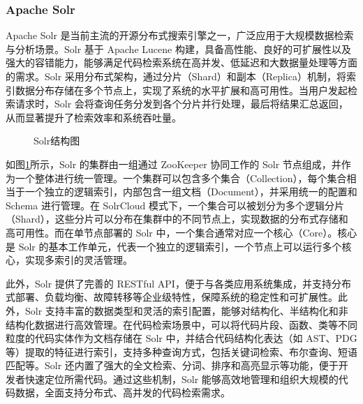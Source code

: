 \documentclass[UTF8,a4paper,12pt]{ctexart}
\numberwithin{equation}{section}
\begin{document}
\subsubsection{Apache Solr}
Apache Solr\cite{ref12} 是当前主流的开源分布式搜索引擎之一，广泛应用于大规模数据检索与分析场景。Solr 基于 Apache Lucene 构建，具备高性能、良好的可扩展性以及强大的容错能力，能够满足代码检索系统在高并发、低延迟和大数据量处理等方面的需求。Solr 采用分布式架构，通过分片（Shard）和副本（Replica）机制，将索引数据分布存储在多个节点上，实现了系统的水平扩展和高可用性。当用户发起检索请求时，Solr 会将查询任务分发到各个分片并行处理，最后将结果汇总返回，从而显著提升了检索效率和系统吞吐量。\par

\begin{figure}[H]
	\caption{Solr结构图}
	\label{solr}
\end{figure}

如图\ref{solr}所示，Solr 的集群由一组通过 ZooKeeper 协同工作的 Solr 节点组成，并作为一个整体进行统一管理。一个集群可以包含多个集合（Collection），每个集合相当于一个独立的逻辑索引，内部包含一组文档（Document），并采用统一的配置和 Schema 进行管理。在 SolrCloud 模式下，一个集合可以被划分为多个逻辑分片（Shard），这些分片可以分布在集群中的不同节点上，实现数据的分布式存储和高可用性。而在单节点部署的 Solr 中，一个集合通常对应一个核心（Core）。核心是 Solr 的基本工作单元，代表一个独立的逻辑索引，一个节点上可以运行多个核心，实现多索引的灵活管理。\par

此外，Solr 提供了完善的 RESTful API，便于与各类应用系统集成，并支持分布式部署、负载均衡、故障转移等企业级特性，保障系统的稳定性和可扩展性。此外，Solr 支持丰富的数据类型和灵活的索引配置，能够对结构化、半结构化和非结构化数据进行高效管理。在代码检索场景中，可以将代码片段、函数、类等不同粒度的代码实体作为文档存储在 Solr 中，并结合代码结构化表达（如 AST、PDG 等）提取的特征进行索引，支持多种查询方式，包括关键词检索、布尔查询、短语匹配等。Solr 还内置了强大的全文检索、分词、排序和高亮显示等功能，便于开发者快速定位所需代码。通过这些机制，Solr 能够高效地管理和组织大规模的代码数据，全面支持分布式、高并发的代码检索需求。\par
\end{document}
